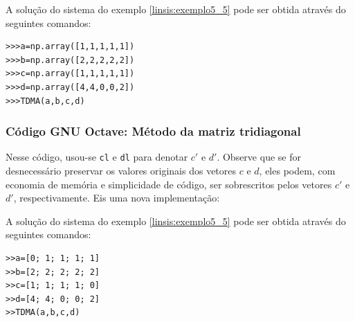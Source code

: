 

A solução do sistema do exemplo \ref{linsis:exemplo5_5} pode ser obtida através do seguintes comandos:
\begin{verbatim}
>>>a=np.array([1,1,1,1,1])
>>>b=np.array([2,2,2,2,2])
>>>c=np.array([1,1,1,1,1])
>>>d=np.array([4,4,0,0,2])
>>>TDMA(a,b,c,d)
\end{verbatim}
\fi


\ifisoctave
\subsubsection{Código GNU Octave: Método da matriz tridiagonal}



Nesse código, usou-se \verb+cl+ e \verb+dl+ para denotar $c'$ e $d'$. Observe que se for desnecessário preservar os valores originais dos vetores $c$ e $d$, eles podem, com economia de memória e simplicidade de código, ser sobrescritos pelos vetores $c'$ e $d'$, respectivamente. Eis uma nova implementação:



A solução do sistema do exemplo \ref{linsis:exemplo5_5} pode ser obtida através do seguintes comandos:
\begin{verbatim}
>>a=[0; 1; 1; 1; 1]
>>b=[2; 2; 2; 2; 2]
>>c=[1; 1; 1; 1; 0]
>>d=[4; 4; 0; 0; 2]
>>TDMA(a,b,c,d)
\end{verbatim}
\fi


